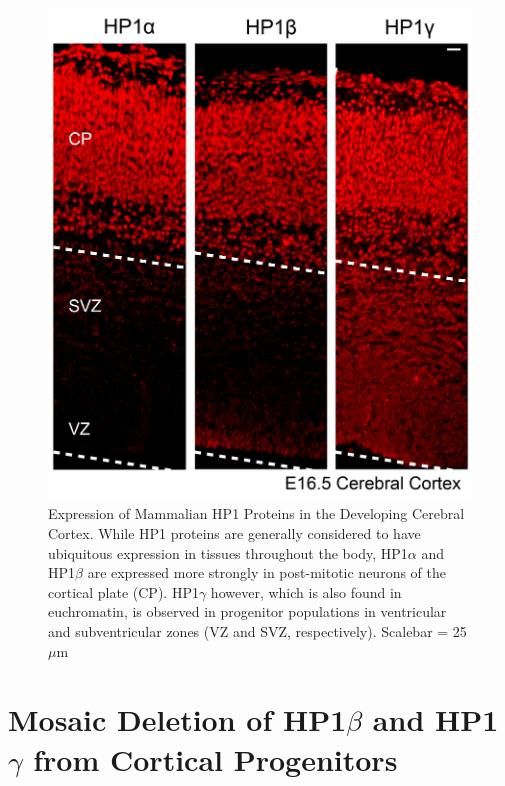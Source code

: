 \documentclass[onehalf,12pt]{beavtex}
\begin{document}
  \begin{figure}
  
  {\centering \includegraphics[width=0.9\linewidth, ]{./figure/results/HP1brainexp} 
  
  }
  
  \caption[Expression of Mammalian HP1 Proteins in the Developing Cerebral Cortex]{Expression of Mammalian HP1 Proteins in the Developing Cerebral Cortex. While HP1 proteins are generally considered to have ubiquitous expression in tissues throughout the body, HP1$\alpha$ and HP1$\beta$ are expressed more strongly in post-mitotic neurons of the cortical plate (CP).  HP1$\gamma$ however, which is also found in euchromatin, is observed in progenitor populations in ventricular and subventricular zones (VZ and SVZ, respectively). Scalebar = 25$\mu$m}\label{fig:HP1brainexp}
  \end{figure}
  
  \section{\texorpdfstring{Mosaic Deletion of HP1\(\beta\) and
  HP1\(\gamma\) from Cortical
  Progenitors}{Mosaic Deletion of HP1\textbackslash{}beta and HP1\textbackslash{}gamma from Cortical Progenitors}}\label{mosaic-deletion-of-hp1beta-and-hp1gamma-from-cortical-progenitors}
  
\end{document}
